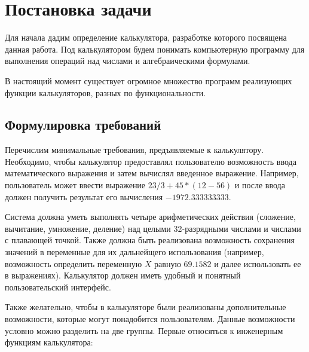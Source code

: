 \section{Постановка задачи}
Для начала дадим определение калькулятора, разработке 
которого посвящена данная работа. Под калькулятором будем 
понимать компьютерную программу для выполнения операций над числами 
и алгебраическими формулами.

В настоящий момент существует огромное множество программ реализующих 
функции калькуляторов, разных по функциональности. 

\subsection{Формулировка требований}
Перечислим минимальные требования, предъявляемые к калькулятору.
Необходимо, чтобы калькулятор предоставлял пользователю 
возможность ввода математического выражения и затем вычислял 
введенное выражение. Например, пользователь может ввести 
выражение $23/3+45*(12-56)$ и после ввода должен получить 
результат его вычисления $-1972.333333333$.

Система должна уметь выполнять четыре  арифметических действия 
(сложение, вычитание, умножение, деление) над целыми 32-разрядными 
числами и числами с плавающей точкой. Также должна быть реализована 
возможность сохранения значений в переменные для их дальнейщего 
использования (например, возможность определить переменную 
$X$ равную $69.1582$ и далее использовать ее в выражениях). 
Калькулятор должен иметь удобный и понятный пользовательский интерфейс.

Также желательно, чтобы в калькуляторе были реализованы 
дополнительные возможности, которые могут понадобится пользователям.
Данные возможности условно можно разделить на две группы.
Первые относяться к инженерным функциям калькулятора:

